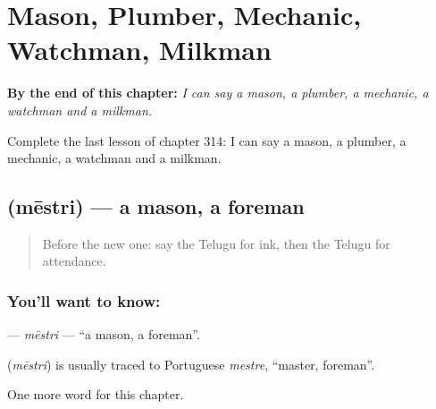 
\chapter{Mason, Plumber, Mechanic, Watchman, Milkman}
\label{ch:te-mason-plumber-mechanic-watchman-milkman}

\begin{chapteropening}
\textbf{By the end of this chapter:} \emph{I can say a mason, a plumber, a mechanic, a watchman and a milkman.}

Complete the last lesson of chapter 314: I can say a mason, a plumber, a mechanic, a watchman and a milkman.
\end{chapteropening}

\section[\texorpdfstring{\te{మేస్త్రి} (mēstri)}{మేస్త్రి (mēstri)}]{ (mēstri) — a mason, a foreman}

\label{lesson:TE-C314-mestri}



\begin{quote}
Before the new one: say the Telugu for ink, then the Telugu for attendance.
\end{quote}

\subsection*{You'll want to know: }
\textbf{} — \emph{mēstri} — \textquotedblleft{}a mason, a foreman\textquotedblright{}.

\begin{cousinweb}
\textbf{} (\emph{mēstri}) is usually traced to Portuguese \emph{mestre}, \textquotedblleft{}master, foreman\textquotedblright{}.
\end{cousinweb}

\begin{grammarlens}[title={What you've built}]
One more word for this chapter.
\end{grammarlens}

